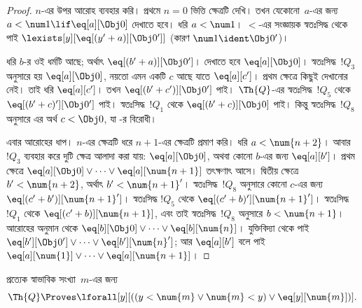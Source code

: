 \documentclass[../../../include/open-logic-section]{subfiles}
\begin{document}
\begin{proof}
$n$-এর উপর আরোহ ব্যবহার করি। প্রথমে $n = 0$ ভিত্তি ক্ষেত্রটি দেখি। তখন
যেকোনো~$a$-এর জন্য $a < \num 1 \lif \eq[a][\Obj 0]$ দেখাতে হবে। ধরি
$a < \num 1$। $<$-এর সংজ্ঞায়ক স্বতঃসিদ্ধ থেকে পাই
$\lexists[y][\eq[(y'+a)][\Obj 0']]$ (কারণ
$\num 1 \ident \Obj 0'$)।

ধরি $b$-র ওই ধর্মটি আছে; অর্থাৎ $\eq[(b'+a)][\Obj 0']$। দেখাতে হবে
$\eq[a][\Obj 0]$। স্বতঃসিদ্ধ~$!Q_3$ অনুসারে হয় $\eq[a][\Obj 0]$, নয়তো
এমন একটি $c$ আছে যাতে $\eq[a][c']$। প্রথম ক্ষেত্রে কিছুই দেখানোর নেই। তাই
ধরি $\eq[a][c']$। তখন $\eq[(b' + c')][\Obj 0']$ পাই। $\Th{Q}$-এর
স্বতঃসিদ্ধ~$!Q_5$ থেকে $\eq[(b'+c)'][\Obj 0']$ পাই। স্বতঃসিদ্ধ~$!Q_1$ থেকে
$\eq[(b' + c)][\Obj 0]$ পাই। কিন্তু স্বতঃসিদ্ধ~$!Q_8$ অনুসারে এর অর্থ
$c < \Obj 0$, যা -র বিরোধী।

এবার আরোহের ধাপ। $n$-এর ক্ষেত্রটি ধরে $n+1$-এর ক্ষেত্রটি প্রমাণ করি। ধরি
$a < \num {n+2}$। আবার $!Q_3$ ব্যবহার করে দুটি ক্ষেত্র আলাদা করা যায়:
$\eq[a][\Obj 0]$, অথবা কোনো $b$-এর জন্য $\eq[a][b']$। প্রথম ক্ষেত্রে
$\eq[a][\Obj 0] \lor \dots \lor \eq[a][\num{n+1}]$ তৎক্ষণাৎ আসে। দ্বিতীয়
ক্ষেত্রে $b' < \num {n+2}$, অর্থাৎ $b' < \num{n+1}'$। স্বতঃসিদ্ধ~$!Q_8$
অনুসারে কোনো $c$-এর জন্য $\eq[(c'+b')][\num{n+1}']$। স্বতঃসিদ্ধ $!Q_5$ থেকে
$\eq[(c'+b)'][\num{n+1}']$। স্বতঃসিদ্ধ~$!Q_1$ থেকে
$\eq[(c'+b)][\num{n+1}]$, এবং তাই স্বতঃসিদ্ধ~$!Q_8$ অনুসারে
$b < \num{n+1}$। আরোহের অনুমান থেকে
$\eq[b][\Obj 0] \lor \dots \lor \eq[b][\num{n}]$। যুক্তিবিদ্যা থেকে পাই
$\eq[b'][\Obj 0'] \lor \dots \lor \eq[b'][\num{n}']$; আর
$\eq[a][b']$ বলে পাই
$\eq[a][\num{1}] \lor \dots \lor \eq[a][\num{n+1}]$।
\end{proof}

\begin{lem}
   প্রত্যেক স্বাভাবিক সংখ্যা~$m$-এর জন্য
  \[
  \Th{Q} \Proves
  \lforall[y][((y < \num{m} \lor \num{m} < y) \lor \eq[y][\num{m}])].
  \]
\end{lem}
\end{document}
